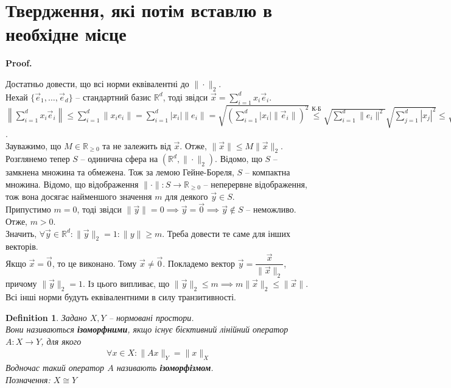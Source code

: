 \documentclass[a4paper, 10pt]{article}
\makeatletter
\theoremstyle{theoremdd}
\theoremstyle{theoremdd}
\newtheorem{definition}[theorem]{Definition}
\theoremstyle{theoremdd}
\theoremstyle{theoremdd}
\theoremstyle{theoremdd}
\theoremstyle{theoremdd}
\theoremstyle{theoremdd}
\theoremstyle{theoremdd}
\renewenvironment{proof}[1][Proof.\\]{\par
\pushQED{\hfill \qed}%
\normalfont \topsep6\p@\@plus6\p@\relax
\trivlist
\item\relax
{\bfseries
#1\@addpunct{.}}\hspace\labelsep\ignorespaces
}{%
\popQED\endtrivlist\@endpefalse
}
\makeatother
\begin{document}
\newpage

\section*{Твердження, які потім вставлю в необхідне місце}
\begin{proof}
Достатньо довести, що всі норми еквівалентні до $\| \cdot \|_2$.\\
Нехай $\{\vec{e}_1,\dots,\vec{e}_d\}$ -- стандартний базис $\mathbb{R}^d$, тоді звідси $\vec{x} = \displaystyle\sum_{i=1}^d x_i \vec{e}_i$.\\
$\displaystyle\left\| \sum_{i=1}^d x_i \vec{e}_i
 \right\| \leq \sum_{i=1}^d \| x_i e_i \| = \sum_{i=1}^d |x_i| \|e_i\| = \sqrt{\left( \sum_{i=1}^d |x_i| \|\vec{e}_i\| \right)^2} \overset{\text{К-Б}}{\leq} \sqrt{\sum_{i=1}^d \|e_i\|^2} \sqrt{\sum_{j=1}^d |x_j|^2} \leq \sqrt{\sum_{i=1}^d \|e_i\|^2} \sqrt{\sum_{j=1}^\infty |x_j|^2} = \sqrt{\sum_{i=1}^d \|e_i\|^2} \|\vec{x}\|_2 = M \|\vec{x}\|_2$.\\
Зауважимо, що $M \in \mathbb{R}_{\geq 0}$ та не залежить від $\vec{x}$. Отже, $\|\vec{x}\| \leq M \|\vec{x}\|_2$.
\bigskip \\
Розглянемо тепер $S$ -- одинична сфера на $(\mathbb{R}^d, \|\cdot \|_2)$. Відомо, що $S$ -- замкнена множина та обмежена. Тож за лемою Гейне-Бореля, $S$ -- компактна множина. Відомо, що відображення $\| \cdot \| \colon S \to \mathbb{R}_{\geq 0}$ -- неперервне відображення, тож вона досягає найменшого значення $m$ для деякого $\vec{y} \in S$.\\
Припустимо $m = 0$, тоді звідси $\|\vec{y}\| = 0 \implies \vec{y} = \vec{0} \implies \vec{y} \notin S$ -- неможливо. Отже, $m > 0$.\\
Значить, $\forall \vec{y} \in \mathbb{R}^d: \|\vec{y}\|_2 = 1: \|y\| \geq m$. Треба довести те саме для інших векторів.\\
Якщо $\vec{x} = \vec{0}$, то це виконано. Тому $\vec{x} \neq \vec{0}$. Покладемо вектор $\vec{y} = \dfrac{\vec{x}}{\| \vec{x} \|_2}$, причому $\|\vec{y}\|_2 = 1$. Із цього випливає, що $\| \vec{y} \|_2 \leq m \implies m \|\vec{x}\|_2 \leq \|\vec{x}\|$.
\bigskip \\
Всі інші норми будуть еквівалентними в силу транзитивності.
\end{proof}

\begin{definition}
Задано $X,Y$ -- нормовані простори.\\
Вони називаються \textbf{ізоморфними}, якщо існує бієктивний лінійний оператор $A \colon X \to Y$, для якого
\begin{align*}
\forall x \in X: \|Ax\|_Y = \|x\|_X
\end{align*}
Водночас такий оператор $A$ називають \textbf{ізоморфізмом}.\\
Позначення: $X \cong Y$
\end{definition}
\end{document}
